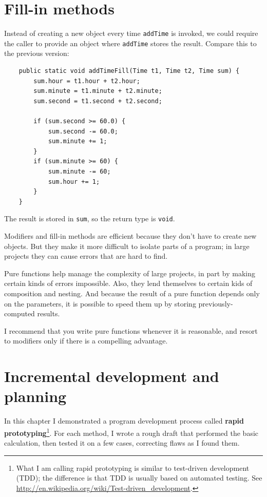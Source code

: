 \documentclass[12pt]{book}
\theoremstyle{exercise}
\begin{document}
\section{Fill-in methods}

Instead of creating a new object every time {\tt addTime} is
invoked, we could require the caller to provide an
object where {\tt addTime} stores the result.  Compare
this to the previous version:

\begin{lstlisting}
    public static void addTimeFill(Time t1, Time t2, Time sum) {
        sum.hour = t1.hour + t2.hour;
        sum.minute = t1.minute + t2.minute;
        sum.second = t1.second + t2.second;

        if (sum.second >= 60.0) {
            sum.second -= 60.0;
            sum.minute += 1;
        }
        if (sum.minute >= 60) {
            sum.minute -= 60;
            sum.hour += 1;
        }
    }
\end{lstlisting}
%
The result is stored in {\tt sum}, so the return type is {\tt void}.

Modifiers and fill-in methods are efficient because they
don't have to create new objects.  But they make it more
difficult to isolate parts of a program; in large projects they can
cause errors that are hard to find.

Pure functions help manage the complexity of large projects,
in part by making certain kinds of errors impossible.  Also, they
lend themselves to certain kids of composition and nesting.
And because the result of a pure function depends only on the parameters,
it is possible to speed them up by storing previously-computed
results.

I recommend that you write pure functions whenever
it is reasonable, and resort to modifiers only if there
is a compelling advantage.


\section{Incremental development and planning}

In this chapter I demonstrated a program development process called
{\bf rapid prototyping}\footnote{What I am calling rapid prototyping
  is similar to test-driven development (TDD); the difference is that
  TDD is usually based on automated testing.  See
  \url{http://en.wikipedia.org/wiki/Test-driven_development}.}.  For
each method, I wrote a rough draft that performed the
basic calculation, then tested it on a few cases, correcting flaws
as I found them.
\end{document}
